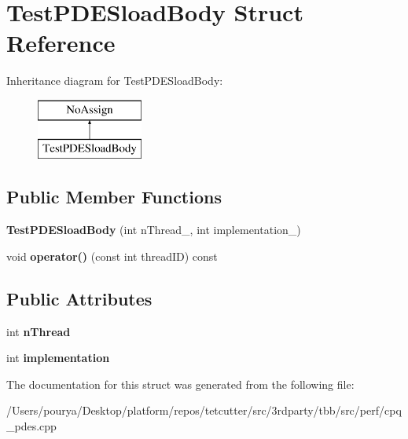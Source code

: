 \hypertarget{structTestPDESloadBody}{}\section{Test\+P\+D\+E\+Sload\+Body Struct Reference}
\label{structTestPDESloadBody}
Inheritance diagram for Test\+P\+D\+E\+Sload\+Body\+:\begin{figure}[H]
\begin{center}
\leavevmode
\includegraphics[height=2.000000cm]{structTestPDESloadBody}
\end{center}
\end{figure}
\subsection*{Public Member Functions}
\begin{DoxyCompactItemize}
\item 
\hypertarget{structTestPDESloadBody_a5081a262c5f6f173e81e10561182bc9a}{}{\bfseries Test\+P\+D\+E\+Sload\+Body} (int n\+Thread\+\_\+, int implementation\+\_\+)\label{structTestPDESloadBody_a5081a262c5f6f173e81e10561182bc9a}

\item 
\hypertarget{structTestPDESloadBody_ad855bda1d5a32c82552c5ab706d112b4}{}void {\bfseries operator()} (const int thread\+I\+D) const \label{structTestPDESloadBody_ad855bda1d5a32c82552c5ab706d112b4}

\end{DoxyCompactItemize}
\subsection*{Public Attributes}
\begin{DoxyCompactItemize}
\item 
\hypertarget{structTestPDESloadBody_a8c054889577c9a0039a7239a2374fea8}{}int {\bfseries n\+Thread}\label{structTestPDESloadBody_a8c054889577c9a0039a7239a2374fea8}

\item 
\hypertarget{structTestPDESloadBody_a1a6ad6b49479be4f1409660a641b8813}{}int {\bfseries implementation}\label{structTestPDESloadBody_a1a6ad6b49479be4f1409660a641b8813}

\end{DoxyCompactItemize}


The documentation for this struct was generated from the following file\+:\begin{DoxyCompactItemize}
\item 
/\+Users/pourya/\+Desktop/platform/repos/tetcutter/src/3rdparty/tbb/src/perf/cpq\+\_\+pdes.\+cpp\end{DoxyCompactItemize}
